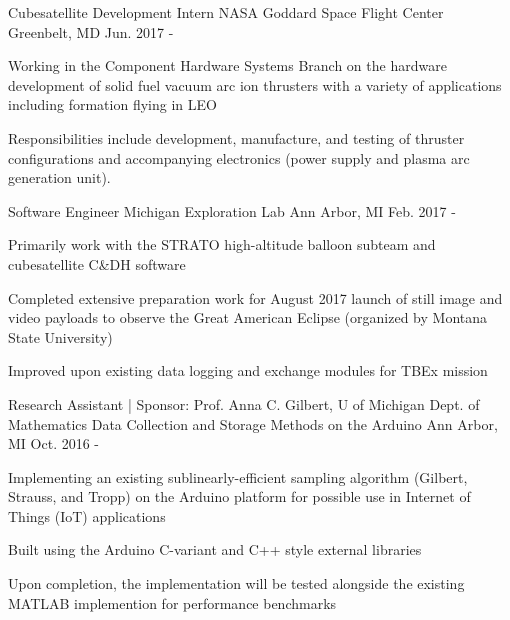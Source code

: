 \begin{cventries}
  \cventry
    {Cubesatellite Development Intern}
    {NASA Goddard Space Flight Center}
    {Greenbelt, MD}
    {Jun. 2017 -}
    {
      \begin{cvitems}
         \item {Working in the Component Hardware Systems Branch on the hardware development of solid fuel vacuum arc ion thrusters with a variety of applications including formation flying in LEO}
         \item {Responsibilities include development, manufacture, and testing of thruster configurations and accompanying electronics (power supply and plasma arc generation unit). }
      \end{cvitems}
    }

  \cventry
    {Software Engineer}
    {Michigan Exploration Lab}
    {Ann Arbor, MI}
    {Feb. 2017 -}
    {
      \begin{cvitems}
        \item {Primarily work with the STRATO high-altitude balloon subteam and cubesatellite C\&DH software}
        \item {Completed extensive preparation work for August 2017 launch of still image and video payloads to observe the Great American Eclipse (organized by Montana State University)}
        \item {Improved upon existing data logging and exchange modules for TBEx mission} 
      \end{cvitems}
    }

 
  \cventry
    {Research Assistant | Sponsor: Prof. Anna C. Gilbert, U of Michigan Dept. of Mathematics}
    {Data Collection and Storage Methods on the Arduino}
    {Ann Arbor, MI}
    {Oct. 2016 -}
    {
      \begin{cvitems}
        \item {Implementing an existing sublinearly-efficient sampling algorithm (Gilbert, Strauss, and Tropp) on the Arduino platform for possible use in Internet of Things (IoT) applications}
        \item {Built using the Arduino C-variant and C++ style external libraries}
        \item {Upon completion, the implementation will be tested alongside the existing MATLAB implemention for performance benchmarks}
      \end{cvitems}
    }
    

\end{cventries}
